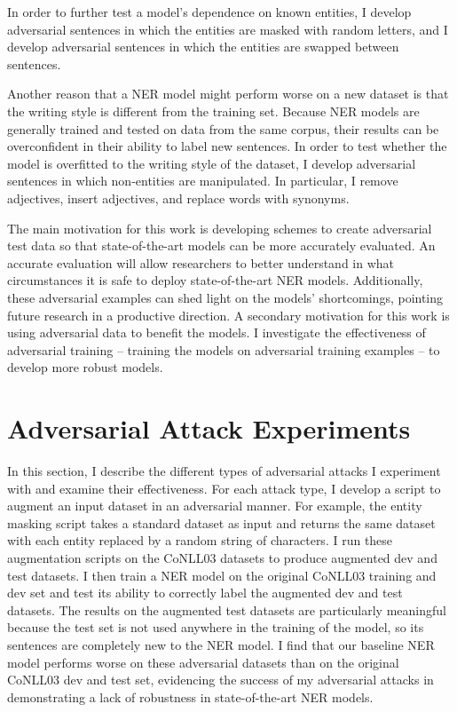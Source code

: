 In order to further test a model's dependence on known entities, I develop adversarial sentences in which the entities are masked with random letters, and I develop adversarial sentences in which the entities are swapped between sentences.

Another reason that a NER model might perform worse on a new dataset is that the writing style is different  from the training set. Because NER models are generally trained and tested on data from the same corpus, their results can be overconfident in their ability to label new sentences. In order to test whether the model is overfitted to the writing style of the dataset, I develop adversarial sentences in which non-entities are manipulated. In particular, I remove adjectives, insert adjectives, and replace words with synonyms.

The main motivation for this work is developing schemes to create adversarial test data so that state-of-the-art models can be more accurately evaluated. An accurate evaluation will allow researchers to better understand in what circumstances it is safe to deploy state-of-the-art NER models. Additionally, these adversarial examples can shed light on the models' shortcomings, pointing future research in a productive direction. A secondary motivation for this work is using adversarial data to benefit the models. I investigate the effectiveness of adversarial training -- training the models on adversarial training examples -- to develop more robust models.


\section{Adversarial Attack Experiments}
\label{sec:advattackexp}
In this section, I describe the different types of adversarial attacks I experiment with and examine their effectiveness. For each attack type, I develop a script to augment an input dataset in an adversarial manner. For example, the entity masking script takes a standard dataset as input and returns the same dataset with each entity replaced by a random string of characters. I run these augmentation scripts on the CoNLL03 datasets to produce augmented dev and test datasets. I then train a NER model on the original CoNLL03 training and dev set and test its ability to correctly label the augmented dev and test datasets. The results on the augmented test datasets are particularly meaningful because the test set is not used anywhere in the training of the model, so its sentences are completely new to the NER model. I find that our baseline NER model performs worse on these adversarial datasets than on the original CoNLL03 dev and test set, evidencing the success of my adversarial attacks in demonstrating a lack of robustness in state-of-the-art NER models.

